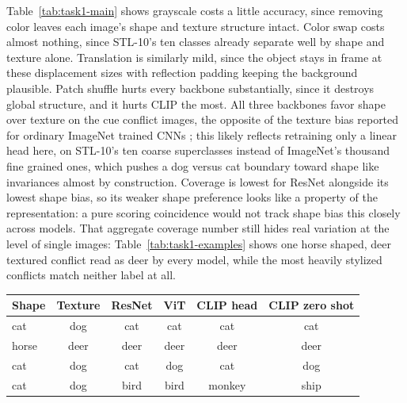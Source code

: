 \documentclass{article}
\begin{document}
Table~\ref{tab:task1-main} shows grayscale costs a little accuracy, since
removing color leaves each image's shape and texture structure intact.
Color swap costs almost nothing, since STL-10's ten classes already
separate well by shape and texture alone. Translation is similarly mild,
since the object stays in frame at these displacement sizes with
reflection padding keeping the background plausible. Patch shuffle hurts
every backbone substantially, since it destroys global structure, and it
hurts CLIP the most.
All three backbones favor shape over
texture on the cue conflict images, the opposite of the texture bias
reported for ordinary ImageNet trained CNNs
\citep{geirhos2019imagenettrained}; this likely reflects retraining only a
linear head here, on STL-10's ten coarse superclasses instead of
ImageNet's thousand fine grained ones, which pushes a dog versus cat
boundary toward shape like invariances almost by construction. Coverage is
lowest for ResNet alongside its lowest shape bias, so its weaker shape
preference looks like a property of the representation: a pure
scoring coincidence would not track shape bias this closely across models.
That aggregate coverage number still hides real
variation at the level of single images: Table~\ref{tab:task1-examples}
shows one horse shaped, deer textured conflict read as deer by every
model, while the most heavily stylized conflicts match neither label at
all.

\begin{center}
\small
\begin{tabular}{lccccc}
  \toprule
  Shape & Texture & ResNet & ViT & CLIP head & CLIP zero shot \\
  \midrule
  cat & dog & cat & cat & cat & cat \\
  horse & deer & deer & deer & deer & deer \\
  cat & dog & cat & dog & cat & dog \\
  cat & dog & bird & bird & monkey & ship \\
  \bottomrule
\end{tabular}
\label{tab:task1-examples}
\end{center}
\end{document}
